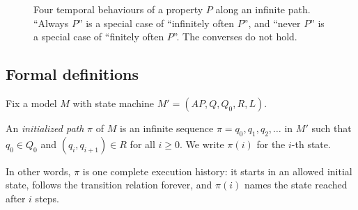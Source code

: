 \begin{figure}[ht]
  \centering
  \caption{Four temporal behaviours of a property $P$ along an infinite path.
           ``Always $P$'' is a special case of ``infinitely often $P$'', and
           ``never $P$'' is a special case of ``finitely often $P$''.  The
           converses do not hold.}
  \label{fig:temporal-hierarchy}
\end{figure}

\subsection{Formal definitions}

Fix a model $M$ with state machine $M' = (AP, Q, Q_0, R, L)$.

\begin{definition}
\label{def:init-path}
An \emph{initialized path} $\pi$ of $M$ is an infinite sequence
$\pi = q_0, q_1, q_2, \ldots$ in $M'$ such that $q_0 \in Q_0$ and
$(q_i, q_{i+1}) \in R$ for all $i \geq 0$.  We write $\pi(i)$ for the
$i$-th state.
\end{definition}

In other words, \(\pi\) is one complete execution history: it starts in an
allowed initial state, follows the transition relation forever, and
\(\pi(i)\) names the state reached after \(i\) steps.


